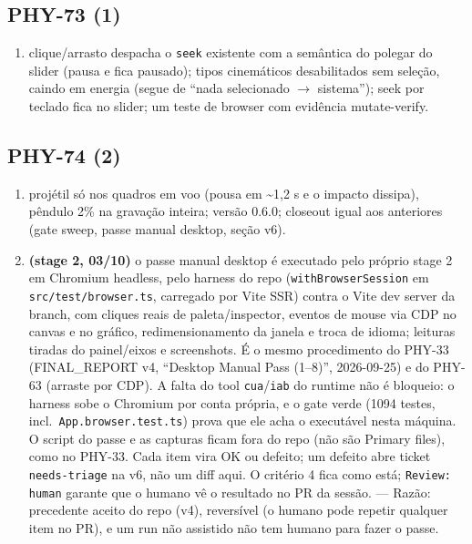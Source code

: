 \documentclass[11pt,a4paper]{article}
\begin{document}
{\subsection*{PHY-73 (1)}
\begin{enumerate}
  \item clique/arrasto despacha o \texttt{seek} existente com a semântica do polegar do slider (pausa e fica pausado); tipos cinemáticos desabilitados sem seleção, caindo em energia (segue de ``nada selecionado $\to$ sistema''); seek por teclado fica no slider; um teste de browser com evidência mutate-verify.
\end{enumerate}
\subsection*{PHY-74 (2)}
\begin{enumerate}
  \item projétil só nos quadros em voo (pousa em \textasciitilde{}1,2 s e o impacto dissipa), pêndulo 2\% na gravação inteira; versão 0.6.0; closeout igual aos anteriores (gate sweep, passe manual desktop, seção v6).
  \item \textbf{(stage 2, 03/10)} o passe manual desktop é executado pelo próprio stage 2 em Chromium headless, pelo harness do repo (\texttt{withBrowserSession} em \texttt{src/test/browser.ts}, carregado por Vite SSR) contra o Vite dev server da branch, com cliques reais de paleta/inspector, eventos de mouse via CDP no canvas e no gráfico, redimensionamento da janela e troca de idioma; leituras tiradas do painel/eixos e screenshots. É o mesmo procedimento do PHY-33 (FINAL\_REPORT v4, ``Desktop Manual Pass (1--8)'', 2026-09-25) e do PHY-63 (arraste por CDP). A falta do tool \texttt{cua}/\texttt{iab} do runtime não é bloqueio: o harness sobe o Chromium por conta própria, e o gate verde (1094 testes, incl.\ \texttt{App.browser.test.ts}) prova que ele acha o executável nesta máquina. O script do passe e as capturas ficam fora do repo (não são Primary files), como no PHY-33. Cada item vira OK ou defeito; um defeito abre ticket \texttt{needs-triage} na v6, não um diff aqui. O critério 4 fica como está; \texttt{Review: human} garante que o humano vê o resultado no PR da sessão. --- Razão: precedente aceito do repo (v4), reversível (o humano pode repetir qualquer item no PR), e um run não assistido não tem humano para fazer o passe.
\end{enumerate}
}
\end{document}

